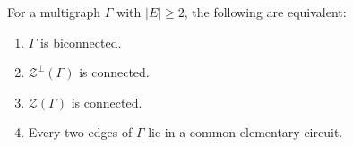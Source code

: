 For a multigraph $\Gamma$ with $|E| \geq 2$, the following are equivalent:
\begin{enumerate}
\item[(a)] $\Gamma$ is biconnected.
\item[(b)] $\mathcal{Z}^\perp(\Gamma)$ is connected.
\item[(c)] $\mathcal{Z}(\Gamma)$ is connected.
\item[(d)] Every two edges of $\Gamma$ lie in a common elementary circuit.
\end{enumerate}